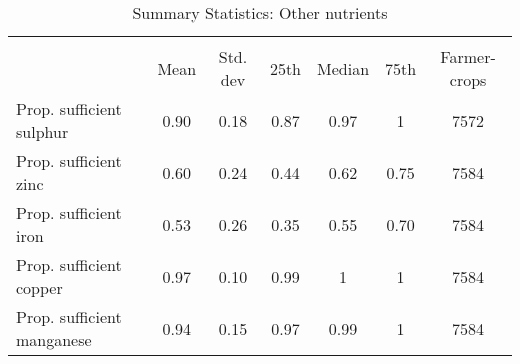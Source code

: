 \begin{table}[htbp]\centering
\def\sym#1{\ifmmode^{#1}\else\(^{#1}\)\fi}
\caption{Summary Statistics: Other nutrients\label{tab:sumstats}}
\begin{tabular}{l*{1}{cccccc}}
\toprule
                    &\multicolumn{6}{c}{}                                                         \\
                    &        Mean&    Std. dev&        25th&      Median&        75th&Farmer-crops\\
\midrule
Prop. sufficient sulphur&        0.90&        0.18&        0.87&        0.97&           1&        7572\\
Prop. sufficient zinc&        0.60&        0.24&        0.44&        0.62&        0.75&        7584\\
Prop. sufficient iron&        0.53&        0.26&        0.35&        0.55&        0.70&        7584\\
Prop. sufficient copper&        0.97&        0.10&        0.99&           1&           1&        7584\\
Prop. sufficient manganese&        0.94&        0.15&        0.97&        0.99&           1&        7584\\
\bottomrule
\end{tabular}
\end{table}
